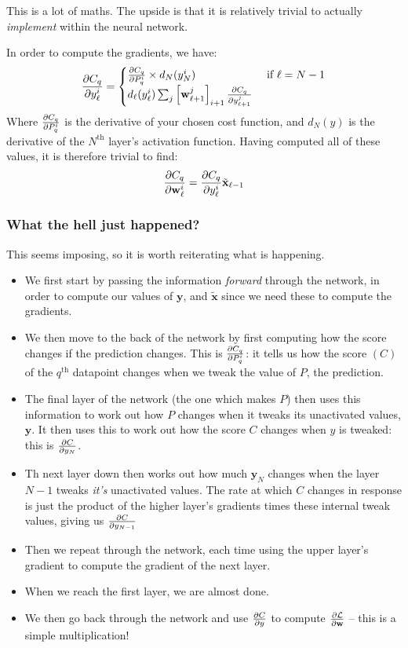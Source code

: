 \documentclass[a4paper,openany,11pt]{book}
\renewcommand\vec[1]{\boldsymbol{\mathbf{#1}}}
\begin{document}
				This is a lot of maths. The upside is that it is relatively trivial to actually \textit{implement} within the neural network. 

				In order to compute the gradients, we have:
				\begin{equation}
					\pdiv{C_q}{y_\ell^i} = \begin{cases} \pdiv{C_q}{P_q^i} \times d_N(y_N^i) & \text{ if $\ell = N-1$}
					\\
					d_\ell(y_\ell^i) \sum_{j}  \left[ \vec{w}_{\ell+1}^j \right]_{i+1} \pdiv{C_q}{y_{\ell+1}^j}
					
					\end{cases}
				\end{equation}
				Where $\frac{\partial C_q}{\partial P_q^i}$ is the derivative of your chosen cost function, and $d_N(y)$ is the derivative of the $N^\text{th}$ layer's activation function. Having computed all of these values, it is therefore trivial to find:
				\begin{equation}
					\pdiv{C_q}{\vec{w}_\ell^i} = \pdiv{C_q}{y_\ell^i} \tilde{\vec{x}}_{\ell-1}
				\end{equation}

			\subsubsection{What the hell just happened?}
				This seems imposing, so it is worth reiterating what is happening.
				\begin{itemize}
					\item We first start by passing the information \textit{forward} through the network, in order to compute our values of $\vec{y}$, and $\tilde{\vec{x}}$ since we need these to compute the gradients.
					\item We then move to the back of the network by first computing how the score changes if the prediction changes. This is $\frac{\partial C_q}{\partial P_q^i}$: it tells us how the score $(C)$ of the $q^\text{th}$ datapoint changes when we tweak the value of $P$, the prediction. 
					\item The final layer of the network (the one which makes $P$) then uses this information to work out how $P$ changes when it tweaks its unactivated values, $\vec{y}$. It then uses this to work out how the score $C$ changes when $y$ is tweaked: this is $\frac{\partial C}{\partial y_N}$. 
					\item Th next layer down then works out how much $\vec{y}_N$ changes when the layer $N-1$ tweaks \textit{it's} unactivated values. The rate at which $C$ changes in response is just the product of the higher layer's gradients times these internal tweak values, giving us $\frac{\partial C}{\partial y_{N-1}}$
					\item Then we repeat through the network, each time using the upper layer's gradient to compute the gradient of the next layer. 
					\item When we reach the first layer, we are almost done.
					\item We then go back through the network and use $\frac{\partial C}{\partial y}$ to compute $\pdiv{\mathcal{L}}{\vec{w}}$ -- this is a simple multiplication!
				\end{itemize}
			
\end{document}
